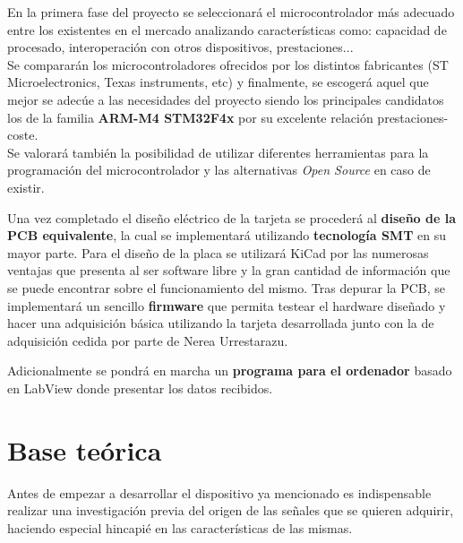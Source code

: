 En la primera fase del proyecto se seleccionará el microcontrolador más adecuado entre los existentes en el mercado analizando características como: capacidad de procesado, interoperación con otros dispositivos, prestaciones...
\\Se compararán los microcontroladores ofrecidos por los distintos fabricantes (ST Microelectronics, Texas instruments, etc) y finalmente, se escogerá aquel que mejor se adecúe a las necesidades del proyecto siendo los principales candidatos los de la familia \textbf{ARM-M4 STM32F4x} por su excelente relación prestaciones-coste.
\\Se valorará también la posibilidad de utilizar diferentes herramientas para la programación del microcontrolador y las alternativas \textit{\gls{Open Source}} en caso de existir.

Una vez completado el diseño eléctrico de la tarjeta se procederá al \textbf{diseño de la \acrshort{PCB} equivalente}, la cual se implementará utilizando \textbf{tecnología \acrshort{SMT}} en su mayor parte. Para el diseño de la placa se utilizará KiCad por las numerosas ventajas que presenta al ser software libre y la gran cantidad de información que se puede encontrar sobre el funcionamiento del mismo.
Tras depurar la \acrshort{PCB}, se implementará un sencillo \textbf{firmware} que permita testear el hardware diseñado y hacer una adquisición básica utilizando la tarjeta desarrollada junto con la de adquisición cedida por parte de Nerea Urrestarazu.

Adicionalmente se pondrá en marcha un \textbf{programa para el ordenador} basado en LabView donde presentar los datos recibidos.

\section{Base teórica\label{sec:Base_teorica}}


Antes de empezar a desarrollar el dispositivo ya mencionado es indispensable realizar una investigación previa del origen de las señales que se quieren adquirir, haciendo especial hincapié en las características de las mismas\footnotemark{}.



